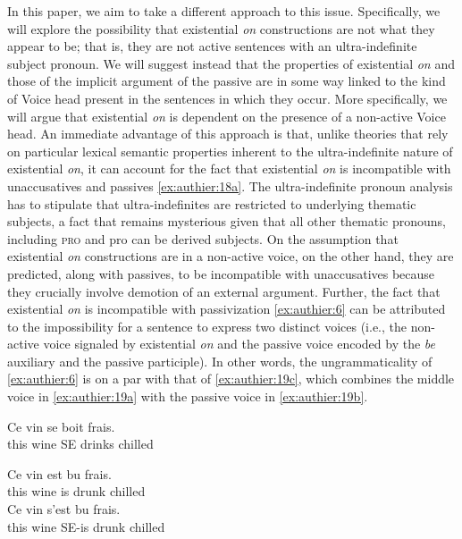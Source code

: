 \documentclass[output=paper,colorlinks,citecolor=brown]{langscibook}
\begin{document}
In this paper, we aim to take a different approach to this issue. Specifically, we will explore the possibility that existential \textit{on} constructions are not what they appear to be; that is, they are not active sentences with an ultra-indefinite subject pronoun. We will suggest instead that the properties of existential \textit{on} and those of the implicit argument of the passive are in some way linked to the kind of Voice head present in the sentences in which they occur. More specifically, we will argue that existential \textit{on} is dependent on the presence of a non-active Voice head. An immediate advantage of this approach is that, unlike theories that rely on particular lexical semantic properties inherent to the ultra-indefinite nature of existential \textit{on}, it can account for the fact that existential \textit{on} is incompatible with unaccusatives and passives \ref{ex:authier:18a}. The ultra-indefinite pronoun analysis has to stipulate that ultra-indefinites are restricted to underlying thematic subjects, a fact that remains mysterious given that all other thematic pronouns, including \textsc{pro} and pro can be derived subjects. On the assumption that existential \textit{on} constructions are in a non-active voice, on the other hand, they are predicted, along with passives, to be incompatible with unaccusatives because they crucially involve demotion of an external argument. Further, the fact that existential \textit{on} is incompatible with passivization \ref{ex:authier:6} can be attributed to the impossibility for a sentence to express two distinct voices (i.e., the non-active voice signaled by existential \textit{on} and the passive voice encoded by the \textit{be} auxiliary and the passive participle). In other words, the ungrammaticality of \ref{ex:authier:6} is on a par with that of \ref{ex:authier:19c}, which combines the middle voice in \ref{ex:authier:19a} with the passive voice in \ref{ex:authier:19b}.

\begin{exe}
\ex\label{ex:authier:19} 
\begin{xlist} %
        \ex\label{ex:authier:19a} 
        \gll    Ce vin se boit frais. \\
                this wine SE drinks chilled\\

        \ex\label{ex:authier:19b} 
        \gll    Ce vin est bu frais. \\
                this wine is drunk chilled\\
        \ex\label{ex:authier:19c} 
        \gll    *Ce vin s’est bu frais. \\
                this wine SE-is drunk chilled\\
\end{xlist}
\end{exe}
\end{document}
